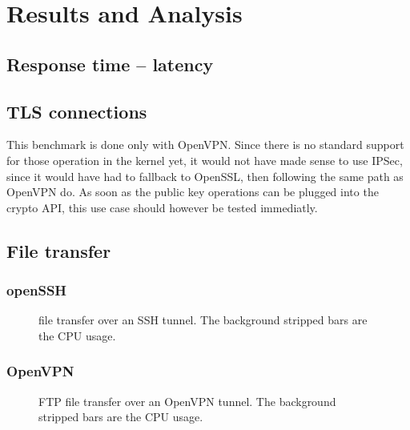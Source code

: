 \chapter{Results and Analysis}\label{chap:results}

\section{Response time -- latency}

\section{TLS connections}

This benchmark is done only with OpenVPN.
Since there is no standard support for those operation in the kernel yet, it would not have made sense to use IPSec, since it would have had to fallback to OpenSSL, then following the same path as OpenVPN do.
As soon as the public key operations can be plugged into the crypto API, this use case should however be tested immediatly.

\section{File transfer}


\subsection{openSSH}

\begin{figure}[ht]

\caption{file transfer over an SSH tunnel. The background stripped bars are the CPU usage.}{}
\label{fig:openssh-bench}
\end{figure}

\subsection{OpenVPN}

\begin{figure}[ht]

\caption{FTP file transfer over an OpenVPN tunnel. The background stripped bars are the CPU usage.}{}
\label{fig:openvpn-ftp-bench}
\end{figure}

